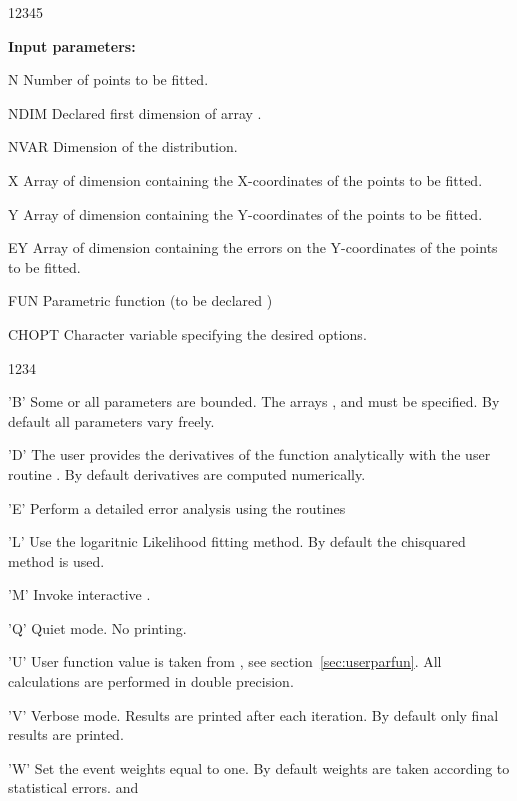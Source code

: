 \begin{DLtt}{12345}
\item[{\rm\bf Input parameters:}]
\item[N] Number of points to be fitted.
\item[NDIM] Declared first dimension of array .
\item[NVAR] Dimension of the distribution.
\item[X] Array of dimension  containing the X-coordinates
      of the points to be fitted.
\item[Y] Array of dimension  containing the Y-coordinates
      of the points to be fitted.
\item[EY] Array of dimension  containing the errors on the
      Y-coordinates of the points to be fitted.
\item[FUN] Parametric function (to be declared )
\item[CHOPT] Character variable specifying the desired options.
\begin{DLtt}{1234}
\item['B'] Some or all parameters are bounded.
           The arrays ,  and 
           must be specified.
           By default all parameters vary freely.
\item['D'] The user provides the derivatives of the function
           analytically with the user routine .
           By default derivatives are computed numerically.
\item['E'] Perform a detailed error analysis using the \MINUIT{} routines
\item['L'] Use the logaritnic Likelihood fitting method.
           By default the chisquared method is used.
\item['M'] Invoke interactive .
\item['Q'] Quiet mode. No printing.
\item['U'] User function value is taken from ,
%
           see section~\ref{sec:userparfun}.
           All calculations are performed in double precision.
\item['V'] Verbose mode.
           Results are printed after each iteration.
           By default only final results are printed.
\item['W'] Set the event weights equal to one.
           By default weights are taken according to statistical errors.
 and 

\end{DLtt}
\end{DLtt}
